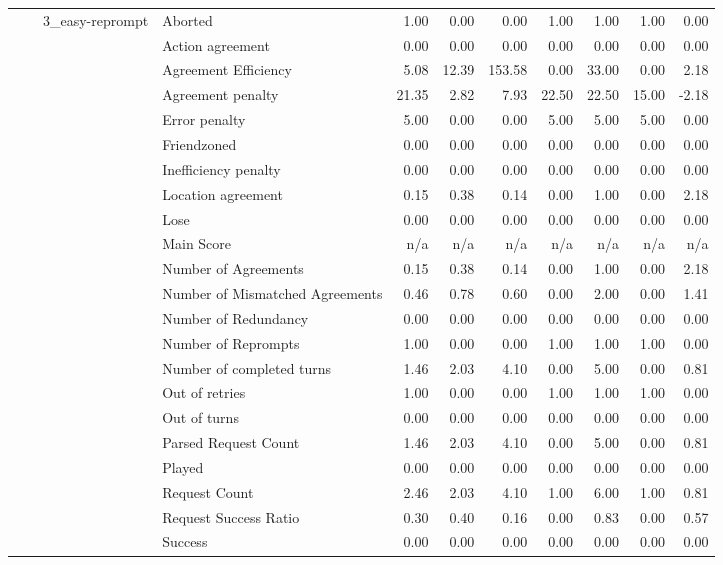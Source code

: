 \begin{tabular}{llllrrrrrrr}
 &  & \multirow[t]{27}{*}{3_easy-reprompt} & Aborted & 1.00 & 0.00 & 0.00 & 1.00 & 1.00 & 1.00 & 0.00 \\
 &  &  & Action agreement & 0.00 & 0.00 & 0.00 & 0.00 & 0.00 & 0.00 & 0.00 \\
 &  &  & Agreement Efficiency & 5.08 & 12.39 & 153.58 & 0.00 & 33.00 & 0.00 & 2.18 \\
 &  &  & Agreement penalty & 21.35 & 2.82 & 7.93 & 22.50 & 22.50 & 15.00 & -2.18 \\
 &  &  & Error penalty & 5.00 & 0.00 & 0.00 & 5.00 & 5.00 & 5.00 & 0.00 \\
 &  &  & Friendzoned & 0.00 & 0.00 & 0.00 & 0.00 & 0.00 & 0.00 & 0.00 \\
 &  &  & Inefficiency penalty & 0.00 & 0.00 & 0.00 & 0.00 & 0.00 & 0.00 & 0.00 \\
 &  &  & Location agreement & 0.15 & 0.38 & 0.14 & 0.00 & 1.00 & 0.00 & 2.18 \\
 &  &  & Lose & 0.00 & 0.00 & 0.00 & 0.00 & 0.00 & 0.00 & 0.00 \\
 &  &  & Main Score & n/a & n/a & n/a & n/a & n/a & n/a & n/a \\
 &  &  & Number of Agreements & 0.15 & 0.38 & 0.14 & 0.00 & 1.00 & 0.00 & 2.18 \\
 &  &  & Number of Mismatched Agreements & 0.46 & 0.78 & 0.60 & 0.00 & 2.00 & 0.00 & 1.41 \\
 &  &  & Number of Redundancy & 0.00 & 0.00 & 0.00 & 0.00 & 0.00 & 0.00 & 0.00 \\
 &  &  & Number of Reprompts & 1.00 & 0.00 & 0.00 & 1.00 & 1.00 & 1.00 & 0.00 \\
 &  &  & Number of completed turns & 1.46 & 2.03 & 4.10 & 0.00 & 5.00 & 0.00 & 0.81 \\
 &  &  & Out of retries & 1.00 & 0.00 & 0.00 & 1.00 & 1.00 & 1.00 & 0.00 \\
 &  &  & Out of turns & 0.00 & 0.00 & 0.00 & 0.00 & 0.00 & 0.00 & 0.00 \\
 &  &  & Parsed Request Count & 1.46 & 2.03 & 4.10 & 0.00 & 5.00 & 0.00 & 0.81 \\
 &  &  & Played & 0.00 & 0.00 & 0.00 & 0.00 & 0.00 & 0.00 & 0.00 \\
 &  &  & Request Count & 2.46 & 2.03 & 4.10 & 1.00 & 6.00 & 1.00 & 0.81 \\
 &  &  & Request Success Ratio & 0.30 & 0.40 & 0.16 & 0.00 & 0.83 & 0.00 & 0.57 \\
 &  &  & Success & 0.00 & 0.00 & 0.00 & 0.00 & 0.00 & 0.00 & 0.00 \\

\end{tabular}

